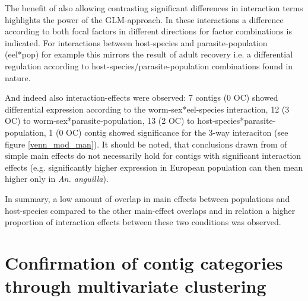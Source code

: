 The benefit of also allowing contrasting significant differences in
interaction terms highlights the power of the GLM-approach. In these
interactions a difference according to both focal factors in different
directions for factor combinations is indicated. For interactions
between host-species and parasite-population (eel*pop) for example
this mirrors the result of adult recovery i.e. a differential
regulation according to host-species/parasite-population combinations
found in nature.

And indeed also interaction-effects were observed: 7 contigs (0 OC)
showed differential expression according to the worm-sex*eel-species
interaction, 12 (3 OC) to worm-sex*parasite-population, 13 (2 OC) to
host-species*parasite-population, 1 (0 OC) contig showed significance
for the 3-way interaciton (see figure \ref{venn_mod_man}). It should
be noted, that conclusions drawn from of simple main effects do not
necessarily hold for contigs with significant interaction effects
(e.g. significantly higher expression in European population can then
mean higher only in \textit{An. anguilla}).


In summary, a low amount of overlap in main effects between
populations and host-species compared to the other main-effect
overlaps and in relation a higher proportion of interaction effects
between these two conditions was observed.

\section{Confirmation of contig categories through multivariate
  clustering}


